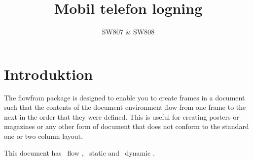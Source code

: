 \documentclass[a4paper,twoside,landscape]{book}
\newcommand{\sty}[1]{\textsf{#1}}
\newcommand{\env}[1]{\textsf{#1}}
\begin{document}
\title{Mobil telefon logning}
\author{SW807 \& SW808}
\date{}
\maketitle

\cleardoublepage
{}

\frontmatter
{}

\clearpage
{}

\mainmatter
\section*{Introduktion}

The \sty{flowfram} package is designed to enable you to create
frames in a document such that the
contents of the \env{document} environment flow from one
frame to the next in the order that they were defined.
This is useful for creating posters
or magazines or any other form of document that does not
conform to the standard one or two column layout.

This document has \themaxflow\ flow
, \themaxstatic\ static
 and
\themaxdynamic\ dynamic .


\finishthispage\mbox{}
\end{document}
